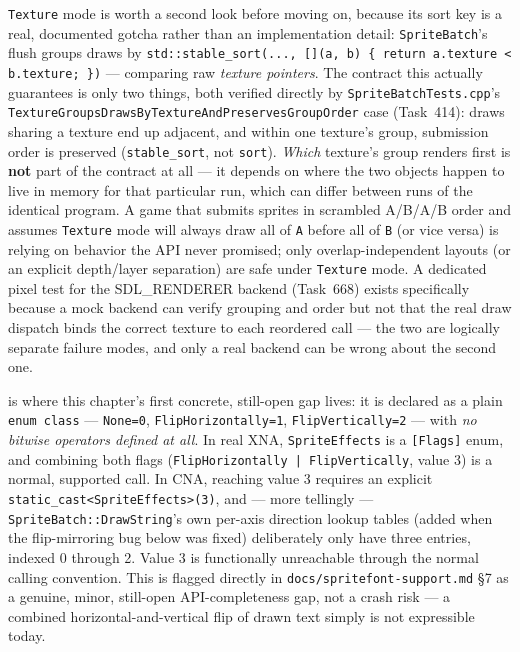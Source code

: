 \texttt{Texture} mode is worth a second look before moving on, because its sort key is a real,
documented gotcha rather than an implementation detail: \texttt{SpriteBatch}'s flush groups
draws by \texttt{std::stable\_sort(..., [](a, b) \{ return a.texture < b.texture; \})} ---
comparing raw \emph{texture pointers}. The contract this actually guarantees is only two
things, both verified directly by \texttt{SpriteBatchTests.cpp}'s
\texttt{TextureGroupsDrawsByTextureAndPreservesGroupOrder} case (Task~414): draws sharing a
texture end up adjacent, and within one texture's group, submission order is preserved
(\texttt{stable\_sort}, not \texttt{sort}). \emph{Which} texture's group renders first is
\textbf{not} part of the contract at all --- it depends on where the two 
objects happen to live in memory for that particular run, which can differ between runs of the
identical program. A game that submits sprites in scrambled A/B/A/B order and assumes
\texttt{Texture} mode will always draw all of \texttt{A} before all of \texttt{B} (or vice
versa) is relying on behavior the API never promised; only overlap-independent layouts (or an
explicit depth/layer separation) are safe under \texttt{Texture} mode. A dedicated pixel test
for the SDL\_RENDERER backend (Task~668) exists specifically because a mock backend can verify
grouping and order but not that the real draw dispatch binds the correct texture to each
reordered call --- the two are logically separate failure modes, and only a real backend can
be wrong about the second one.

 is where this chapter's first concrete, still-open gap lives:
it is declared as a plain \texttt{enum class} --- \texttt{None=0}, \texttt{FlipHorizontally=1},
\texttt{FlipVertically=2} --- with \emph{no bitwise operators defined at all}. In real XNA,
\texttt{SpriteEffects} is a \texttt{[Flags]} enum, and combining both flags
(\texttt{FlipHorizontally | FlipVertically}, value 3) is a normal, supported call. In CNA,
reaching value 3 requires an explicit \texttt{static\_cast<SpriteEffects>(3)}, and --- more
tellingly --- \texttt{SpriteBatch::DrawString}'s own per-axis direction lookup tables (added
when the flip-mirroring bug below was fixed) deliberately only have three entries, indexed
0 through 2. Value 3 is functionally unreachable through the normal calling convention. This
is flagged directly in \texttt{docs/spritefont-support.md} \S7 as a genuine, minor,
still-open API-completeness gap, not a crash risk --- a combined horizontal-and-vertical
flip of drawn text simply is not expressible today.

